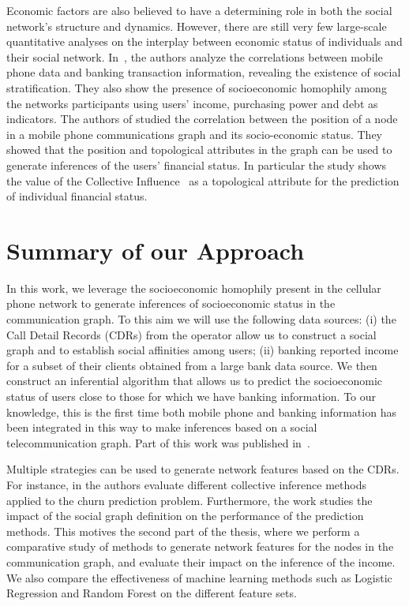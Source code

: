 Economic factors are also believed to have a determining role in both the social network's structure and dynamics. However, there are still very few large-scale quantitative analyses on the interplay between economic status of individuals and their social network. In~\cite{leo2015socioeconomic}, the authors analyze the correlations between mobile phone data and banking transaction information, revealing the existence of social stratification. They also show the presence of socioeconomic homophily among the networks participants using users' income, purchasing power and debt as indicators.
The authors of \cite{Luo2017inferring} studied the correlation between the position of a node in a mobile phone communications graph and its socio-economic status. They showed that the position and topological attributes in the graph can be used to generate inferences of the users' financial status.
In particular the study \cite{Luo2017inferring} shows the value of the Collective Influence~\cite{morone2015influence} as a topological attribute for the prediction of individual financial status.


\section{Summary of our Approach}

In this work, we leverage the socioeconomic homophily present in the cellular phone network to generate inferences of socioeconomic status in the communication graph. To this aim we will use the following data sources: (i) the Call Detail Records (CDRs) from the operator allow us to construct a social graph and to establish social affinities among users; (ii) banking reported income for a subset of their clients obtained from a large bank data source. We then construct an inferential algorithm that allows us to predict the socioeconomic status of users close to those for which we have banking information. To our knowledge, this is the first time both mobile phone and banking information has been integrated in this way to make inferences based on a social telecommunication graph.
Part of this work was published in~\cite{Fixman2016bayesian}.



Multiple strategies can be used to generate network features based on the CDRs. For instance, in \cite{oskarsdottir2016} the authors evaluate different collective inference methods applied to the churn prediction problem. Furthermore, the work \cite{oskarsdottir2017social} studies the impact of the social graph definition on the performance of the prediction methods. This motives the second part of the thesis, where we perform a comparative study of methods to generate network features for the nodes in the communication graph, and evaluate their impact on the inference of the income. We also compare the effectiveness of machine learning methods such as Logistic Regression and Random Forest on the different feature sets.

